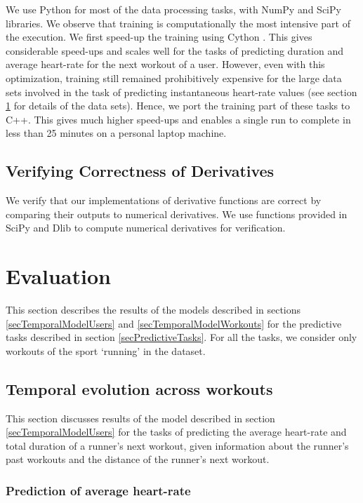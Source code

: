 \documentclass{acm_proc_article-sp}
\begin{document}
We use Python for most of the data processing tasks, with NumPy \cite{numpy} and SciPy \cite{scipy} libraries. We observe that training is computationally the most intensive part of the execution. We first speed-up the training using Cython \cite{cythonNumpy}. This gives considerable speed-ups and scales well for the tasks of predicting duration and average heart-rate for the next workout of a user. However, even with this optimization, training still remained prohibitively expensive for the large data sets involved in the task of predicting instantaneous heart-rate values (see  section \ref{secEvaluation} for details of the data sets). Hence, we port the training part of these tasks to C++. This gives much higher speed-ups and enables a single run to complete in less than 25 minutes on a personal laptop machine.

\subsection{Verifying Correctness of Derivatives}

We verify that our implementations of derivative functions are correct by comparing their outputs to numerical derivatives. We use functions provided in SciPy\cite{scipy} and Dlib\cite{dlib} to compute numerical derivatives for verification.

\section{Evaluation}
\label{secEvaluation}
This section describes the results of the models described in sections \ref{secTemporalModelUsers} and \ref{secTemporalModelWorkouts} for the predictive tasks described in section \ref{secPredictiveTasks}. For all the tasks, we consider only workouts of the sport `running' in the dataset.

\subsection{Temporal evolution across workouts}
This section discusses results of the model described in section \ref{secTemporalModelUsers} for the tasks of predicting the average heart-rate and total duration of a runner's next workout, given information about the runner's past workouts and the distance of the runner's next workout.

\subsubsection{Prediction of average heart-rate}
\end{document}
